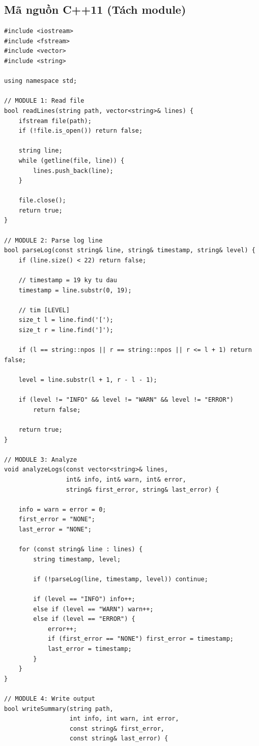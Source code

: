 \subsection{Mã nguồn C++11 (Tách module)}
\begin{lstlisting}
#include <iostream>
#include <fstream>
#include <vector>
#include <string>

using namespace std;

// MODULE 1: Read file
bool readLines(string path, vector<string>& lines) {
    ifstream file(path);
    if (!file.is_open()) return false;

    string line;
    while (getline(file, line)) {
        lines.push_back(line);
    }

    file.close();
    return true;
}

// MODULE 2: Parse log line
bool parseLog(const string& line, string& timestamp, string& level) {
    if (line.size() < 22) return false;

    // timestamp = 19 ky tu dau
    timestamp = line.substr(0, 19);

    // tim [LEVEL]
    size_t l = line.find('[');
    size_t r = line.find(']');

    if (l == string::npos || r == string::npos || r <= l + 1) return false;

    level = line.substr(l + 1, r - l - 1);

    if (level != "INFO" && level != "WARN" && level != "ERROR")
        return false;

    return true;
}

// MODULE 3: Analyze
void analyzeLogs(const vector<string>& lines,
                 int& info, int& warn, int& error,
                 string& first_error, string& last_error) {

    info = warn = error = 0;
    first_error = "NONE";
    last_error = "NONE";

    for (const string& line : lines) {
        string timestamp, level;

        if (!parseLog(line, timestamp, level)) continue;

        if (level == "INFO") info++;
        else if (level == "WARN") warn++;
        else if (level == "ERROR") {
            error++;
            if (first_error == "NONE") first_error = timestamp;
            last_error = timestamp;
        }
    }
}

// MODULE 4: Write output
bool writeSummary(string path,
                  int info, int warn, int error,
                  const string& first_error,
                  const string& last_error) {


\end{lstlisting}
